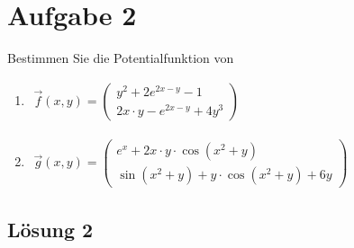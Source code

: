 \documentclass[main.tex]{subfiles}
\begin{document}
\section{Aufgabe 2}
Bestimmen Sie die Potentialfunktion von
\begin{enumerate}
\item
$\begin{aligned}
\vec{f}(x,y) 
= \begin{pmatrix}
	y^2 + 2e^{2x - y} - 1 \\[2mm]
	2x \cdot y - e^{2x - y} + 4y^3
\end{pmatrix}
\end{aligned}$
%
\item
$\begin{aligned}
\vec{g}(x,y) 
= \begin{pmatrix}
	e^x + 2x \cdot y \cdot \cos(x^2 + y) \\[2mm]
    \sin(x^2 + y) + y \cdot \cos(x^2 + y) + 6y
\end{pmatrix}
\end{aligned}$
\end{enumerate}

\subsection{Lösung 2}
\end{document}
